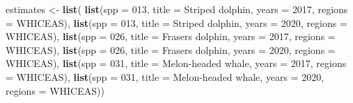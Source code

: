 \documentclass[
]{book}
\newenvironment{Shaded}{\begin{snugshade}}{\end{snugshade}}
\newcommand{\AttributeTok}[1]{\textcolor[rgb]{0.13,0.29,0.53}{#1}}
\newcommand{\DecValTok}[1]{\textcolor[rgb]{0.00,0.00,0.81}{#1}}
\newcommand{\FunctionTok}[1]{\textcolor[rgb]{0.13,0.29,0.53}{\textbf{#1}}}
\newcommand{\NormalTok}[1]{#1}
\newcommand{\OtherTok}[1]{\textcolor[rgb]{0.56,0.35,0.01}{#1}}
\newcommand{\StringTok}[1]{\textcolor[rgb]{0.31,0.60,0.02}{#1}}
\begin{document}
\begin{Shaded}
\begin{Highlighting}[]
\NormalTok{estimates }\OtherTok{\textless{}{-}} \FunctionTok{list}\NormalTok{(}
    \FunctionTok{list}\NormalTok{(}\AttributeTok{spp =} \StringTok{\textquotesingle{}013\textquotesingle{}}\NormalTok{,}
         \AttributeTok{title =} \StringTok{\textquotesingle{}Striped dolphin\textquotesingle{}}\NormalTok{,}
         \AttributeTok{years =} \DecValTok{2017}\NormalTok{,}
         \AttributeTok{regions =} \StringTok{\textquotesingle{}WHICEAS\textquotesingle{}}\NormalTok{),}
    \FunctionTok{list}\NormalTok{(}\AttributeTok{spp =} \StringTok{\textquotesingle{}013\textquotesingle{}}\NormalTok{,}
         \AttributeTok{title =} \StringTok{\textquotesingle{}Striped dolphin\textquotesingle{}}\NormalTok{,}
         \AttributeTok{years =} \DecValTok{2020}\NormalTok{,}
         \AttributeTok{regions =} \StringTok{\textquotesingle{}WHICEAS\textquotesingle{}}\NormalTok{),}
    \FunctionTok{list}\NormalTok{(}\AttributeTok{spp =} \StringTok{\textquotesingle{}026\textquotesingle{}}\NormalTok{,}
         \AttributeTok{title =} \StringTok{\textquotesingle{}Frasers dolphin\textquotesingle{}}\NormalTok{,}
         \AttributeTok{years =} \DecValTok{2017}\NormalTok{,}
         \AttributeTok{regions =} \StringTok{\textquotesingle{}WHICEAS\textquotesingle{}}\NormalTok{),}
    \FunctionTok{list}\NormalTok{(}\AttributeTok{spp =} \StringTok{\textquotesingle{}026\textquotesingle{}}\NormalTok{,}
         \AttributeTok{title =} \StringTok{\textquotesingle{}Frasers dolphin\textquotesingle{}}\NormalTok{,}
         \AttributeTok{years =} \DecValTok{2020}\NormalTok{,}
         \AttributeTok{regions =} \StringTok{\textquotesingle{}WHICEAS\textquotesingle{}}\NormalTok{),}
    \FunctionTok{list}\NormalTok{(}\AttributeTok{spp =} \StringTok{\textquotesingle{}031\textquotesingle{}}\NormalTok{,}
         \AttributeTok{title =} \StringTok{\textquotesingle{}Melon{-}headed whale\textquotesingle{}}\NormalTok{,}
         \AttributeTok{years =} \DecValTok{2017}\NormalTok{,}
         \AttributeTok{regions =} \StringTok{\textquotesingle{}WHICEAS\textquotesingle{}}\NormalTok{),}
    \FunctionTok{list}\NormalTok{(}\AttributeTok{spp =} \StringTok{\textquotesingle{}031\textquotesingle{}}\NormalTok{,}
         \AttributeTok{title =} \StringTok{\textquotesingle{}Melon{-}headed whale\textquotesingle{}}\NormalTok{,}
         \AttributeTok{years =} \DecValTok{2020}\NormalTok{,}
         \AttributeTok{regions =} \StringTok{\textquotesingle{}WHICEAS\textquotesingle{}}\NormalTok{))}
\end{Highlighting}
\end{Shaded}
\end{document}
